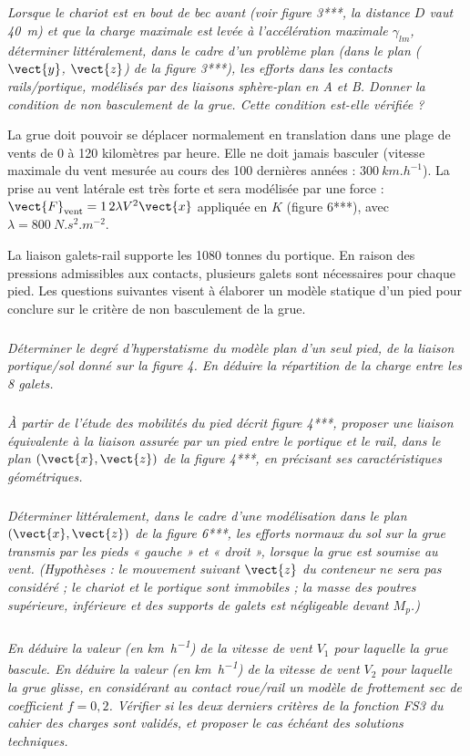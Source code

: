 \documentclass[10pt,fleqn]{article} %
\begin{document}
\subparagraph{\label{q03}}\textit{Lorsque le chariot est en bout de bec avant
(voir figure 3***, la distance $D$ vaut \SI{40}{m}) et que la
charge maximale est levée à l’accélération maximale
$\gamma_{lm}$, déterminer littéralement, dans le cadre
d’un problème plan (dans le plan ($\vect{y}$, $\vect{z}$) de la figure
3***), les efforts dans les contacts rails/portique,
modélisés par des liaisons sphère-plan en A et B.
Donner la condition de non basculement de la grue.
Cette condition est-elle vérifiée ?}


La grue doit pouvoir se déplacer normalement en
translation dans une plage de vents de 0 à 120
kilomètres par heure. Elle ne doit jamais basculer
(vitesse maximale du vent mesurée au cours des
100 dernières années : $\SI{300}{km.h^{-1}}$).
La prise au vent latérale est très forte et sera modélisée
par une force : $\vect{F}_{\text{vent}}=\SI{1}{2}\lambda V^2 \vect{x}$ appliquée
en $K$ (figure 6***), avec $\lambda = \SI{800}{N.s^2.m^{-2}}$.

La liaison galets-rail supporte les 1080 tonnes du
portique. En raison des pressions admissibles aux
contacts, plusieurs galets sont nécessaires pour
chaque pied. Les questions suivantes visent à élaborer
un modèle statique d’un pied pour conclure
sur le critère de non basculement de la grue.

\subparagraph{\label{q04}}\textit{Déterminer le degré d’hyperstatisme du modèle plan d’un seul pied, de la liaison portique/sol donné
sur la figure 4. En déduire la répartition de la charge entre les 8 galets.}

\subparagraph{\label{q05}}\textit{À partir de l’étude des mobilités du pied décrit figure 4***, proposer une liaison équivalente à la liaison
assurée par un pied entre le portique et le rail, dans le plan $(\vect{x},\vect{z})$ de la figure 4***, en précisant ses caractéristiques géométriques.}

\subparagraph{\label{q06}}\textit{Déterminer littéralement, dans le cadre d’une modélisation dans le plan $(\vect{x},\vect{z})$ de la figure 6***, les
efforts normaux du sol sur la grue transmis par les pieds « gauche » et « droit », lorsque la grue est soumise au
vent. (Hypothèses : le mouvement suivant $\vect{z}$ du conteneur ne sera pas considéré ; le chariot et le portique sont
immobiles ; la masse des poutres supérieure, inférieure et des supports de galets est négligeable devant $M_p$.)}

\subparagraph{\label{q07}}\textit{En déduire la valeur (en \si{km.h^{-1}}) de la vitesse de vent $V_1$ pour laquelle la grue bascule. En déduire
la valeur (en \si{km.h^{-1}}) de la vitesse de vent $V_2$ pour laquelle la grue glisse, en considérant au contact roue/rail
un modèle de frottement sec de coefficient $f = 0,2$. Vérifier si les deux derniers critères de la fonction FS3 du
cahier des charges sont validés, et proposer le cas échéant des solutions techniques.}
\end{document}
